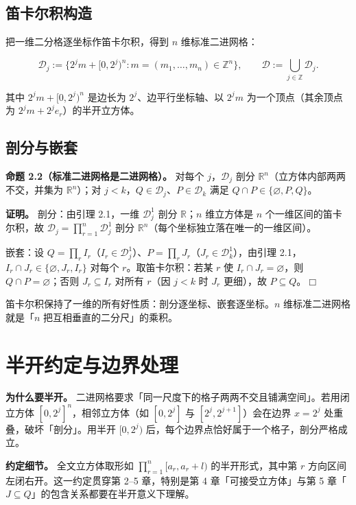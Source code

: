 \documentclass[a4paper,11pt,openany]{ctexbook}
\numberwithin{equation}{chapter}
\numberwithin{figure}{chapter}
\numberwithin{table}{chapter}
\begin{document}
\subsection{笛卡尔积构造}

把一维二分格逐坐标作笛卡尔积，得到 $n$ 维标准二进网格：

$$\mathcal D_j := \{2^j m + [0,2^j)^n : m=(m_1,\dots,m_n)\in\mathbb Z^n\},\qquad \mathcal D:=\bigcup_{j\in\mathbb Z}\mathcal D_j.$$

其中 $2^j m+[0,2^j)^n$ 是边长为 $2^j$、边平行坐标轴、以 $2^j m$ 为一个顶点（其余顶点为 $2^j m+2^j e_r$）的半开立方体。

\subsection{剖分与嵌套}

\textbf{命题 2.2（标准二进网格是二进网格）。} 对每个 $j$，$\mathcal D_j$ 剖分 $\mathbb R^n$（立方体内部两两不交，并集为 $\mathbb R^n$）；对 $j<k$，$Q\in\mathcal D_j$、$P\in\mathcal D_k$ 满足 $Q\cap P\in\{\varnothing,P,Q\}$。

\textbf{证明。} 剖分：由引理 2.1，一维 $\mathcal D_j^1$ 剖分 $\mathbb R$；$n$ 维立方体是 $n$ 个一维区间的笛卡尔积，故 $\mathcal D_j=\prod_{r=1}^n\mathcal D_j^1$ 剖分 $\mathbb R^n$（每个坐标独立落在唯一的一维区间）。

嵌套：设 $Q=\prod_r I_r$（$I_r\in\mathcal D_j^1$）、$P=\prod_r J_r$（$J_r\in\mathcal D_k^1$），由引理 2.1，$I_r\cap J_r\in\{\varnothing,J_r,I_r\}$ 对每个 $r$。取笛卡尔积：若某 $r$ 使 $I_r\cap J_r=\varnothing$，则 $Q\cap P=\varnothing$；否则 $J_r\subseteq I_r$ 对所有 $r$（因 $j<k$ 时 $J_r$ 更细），故 $P\subseteq Q$。$\Box$

\begin{intuitionbox}
笛卡尔积保持了一维的所有好性质：剖分逐坐标、嵌套逐坐标。$n$ 维标准二进网格就是「$n$ 把互相垂直的二分尺」的乘积。
\end{intuitionbox}

\section{半开约定与边界处理}

\textbf{为什么要半开。} 二进网格要求「同一尺度下的格子两两不交且铺满空间」。若用闭立方体 $[0,2^j]^n$，相邻立方体（如 $[0,2^j]$ 与 $[2^j,2^{j+1}]$）会在边界 $x=2^j$ 处重叠，破坏「剖分」。用半开 $[0,2^j)$ 后，每个边界点恰好属于一个格子，剖分严格成立。

\textbf{约定细节。} 全文立方体取形如 $\prod_{r=1}^n[a_r,a_r+l)$ 的半开形式，其中第 $r$ 方向区间左闭右开。这一约定贯穿第 2–5 章，特别是第 4 章「可接受立方体」与第 5 章「$J\subseteq Q$」的包含关系都要在半开意义下理解。
\end{document}
